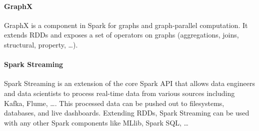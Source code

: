\documentclass[\main/main.tex]{subfiles}
\begin{document}
\paragraph{GraphX} GraphX is a component in Spark for graphs and graph-parallel computation. It extends RDDs and exposes a set of operators on graphs (aggregations, joins, structural, property, \dots).
\paragraph{Spark Streaming} Spark Streaming is an extension of the core Spark API that allows data engineers and data scientists to process real-time data from various sources including Kafka, Flume, \dots. This processed data can be pushed out to filesystems, databases, and live dashboards. Extending RDDs, Spark Streaming can be used with any other Spark components like MLlib, Spark SQL, \dots
\end{document}
